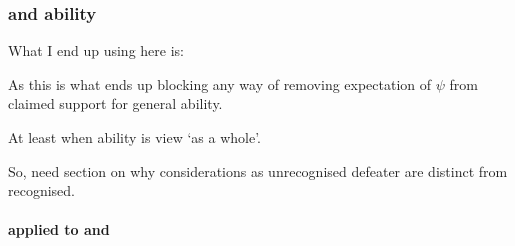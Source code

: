 




\newpage

\subsubsection{\nI{} and ability}
\label{sec:ni-ability}

\begin{note}
  \color{red}
  What I end up using here is:

  \begin{quote}
    \vspace{-\baselineskip}
    \propCSNai*
  \end{quote}
  As this is what ends up blocking any way of removing expectation of \(\psi\) from claimed support for general ability.

  At least when ability is view `as a whole'.

  So, need section on why considerations as unrecognised defeater are distinct from recognised.
\end{note}

\paragraph{\nI{} applied to \gsi{} and \adA{}}
\label{sec:ni-ability:adA}

